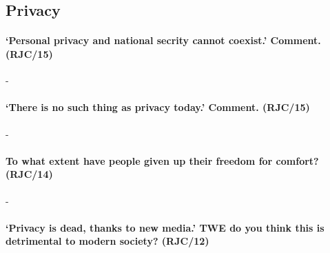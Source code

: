 \documentclass[../../main]{subfiles}
\begin{document}
\subsection{Privacy}

\paragraph{`Personal privacy and national secrity cannot coexist.' Comment. (RJC/15)}-

\paragraph{`There is no such thing as privacy today.' Comment. (RJC/15)}-

\paragraph{To what extent have people given up their freedom for comfort? (RJC/14)}-

\paragraph{`Privacy is dead, thanks to new media.' TWE do you think this is detrimental to modern society? (RJC/12)}
\end{document}
